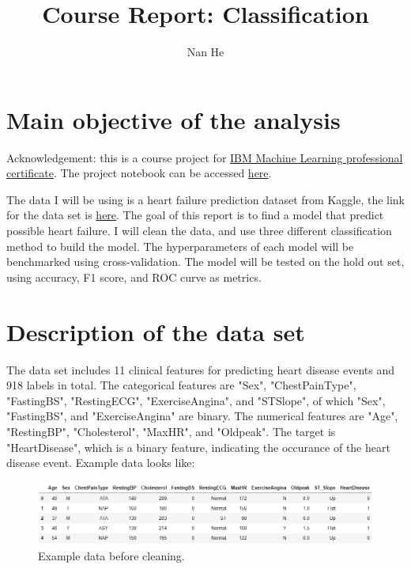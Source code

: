\documentclass[11pt]{article}
\title{Course Report: Classification}
\author{Nan He}
\date{}
\begin{document}
\maketitle


\section{Main objective of the analysis}\label{section-introduction-1}
Acknowledgement: this is a course project for \href{https://www.coursera.org/professional-certificates/ibm-machine-learning}{IBM Machine Learning professional certificate}. The project notebook can be accessed \href{https://github.com/henankf223/Assignment-2/blob/26433c172a58e934f1039ef8de647232f05e747c/PES_DVR_pd.ipynb}{here}.

The data I will be using is a heart failure prediction dataset from Kaggle, the link for the data set is \href{https://www.kaggle.com/fedesoriano/heart-failure-prediction}{here}.
The goal of this report is to find a model that predict possible heart failure.
I will clean the data, and use three different classification method to build the model.
The hyperparameters of each model will be benchmarked using cross-validation.
The model will be tested on the hold out set, using accuracy, F1 score, and ROC curve as metrics.

\section{Description of the data set}\label{section-introduction-2}
The data set includes 11 clinical features for predicting heart disease events and 918 labels in total.
The categorical features are "Sex", "ChestPainType", "FastingBS", "RestingECG", "ExerciseAngina", and "ST\textunderscore Slope", of which "Sex", "FastingBS", and "ExerciseAngina" are binary.
The numerical features are "Age", "RestingBP", "Cholesterol", "MaxHR", and "Oldpeak".
The target is "HeartDisease", which is a binary feature, indicating the occurance of the heart disease event.
Example data looks like:

\begin{figure}[h]
\centerline{\includegraphics[scale=0.5]{cls1.png}}
\caption{Example data before cleaning.}
\end{figure}
\end{document}
